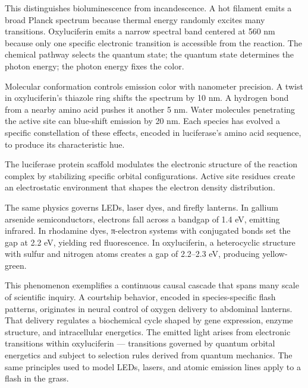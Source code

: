 This distinguishes bioluminescence from incandescence. A hot filament emits a broad Planck spectrum because thermal energy randomly excites many transitions. Oxyluciferin emits a narrow spectral band centered at 560 nm because only one specific electronic transition is accessible from the reaction. The chemical pathway selects the quantum state; the quantum state determines the photon energy; the photon energy fixes the color.

Molecular conformation controls emission color with nanometer precision. A twist in oxyluciferin's thiazole ring shifts the spectrum by 10 nm. A hydrogen bond from a nearby amino acid pushes it another 5 nm. Water molecules penetrating the active site can blue-shift emission by 20 nm. Each species has evolved a specific constellation of these effects, encoded in luciferase's amino acid sequence, to produce its characteristic hue.

The luciferase protein scaffold modulates the electronic structure of the reaction complex by stabilizing specific orbital configurations. Active site residues create an electrostatic environment that shapes the electron density distribution. 

The same physics governs LEDs, laser dyes, and firefly lanterns. In gallium arsenide semiconductors, electrons fall across a bandgap of 1.4 eV, emitting infrared. In rhodamine dyes, π-electron systems with conjugated bonds set the gap at 2.2 eV, yielding red fluorescence. In oxyluciferin, a heterocyclic structure with sulfur and nitrogen atoms creates a gap of 2.2–2.3 eV, producing yellow-green.

This phenomenon exemplifies a continuous causal cascade that spans many scale of scientific inquiry. A courtship behavior, encoded in species-specific flash patterns, originates in neural control of oxygen delivery to abdominal lanterns. That delivery regulates a biochemical cycle shaped by gene expression, enzyme structure, and intracellular energetics. The emitted light arises from electronic transitions within oxyluciferin — transitions governed by quantum orbital energetics and subject to selection rules derived from quantum mechanics. The same principles used to model LEDs, lasers, and atomic emission lines apply to a flash in the grass.


